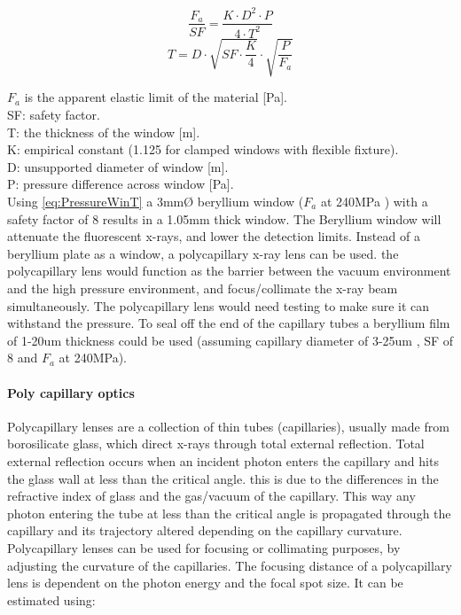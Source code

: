 \begin{equation}
\frac{F_a}{SF} = \frac{K \cdot D^2 \cdot P}{4 \cdot T^2} 
\end{equation}
\begin{equation}
\label{eq:PressureWinT}
T = D \cdot \sqrt{SF \cdot \frac{K}{4}} \cdot \sqrt{\frac{P}{F_a}}
\end{equation}

\noindent$F_a$ is the apparent elastic limit of the material [Pa].\\
SF: safety factor.\\
T: the thickness of the window [m].\\
K: empirical constant (1.125 for clamped windows with flexible fixture).\\
D: unsupported diameter of window [m].\\
P: pressure difference across window [Pa].\\

Using \ref{eq:PressureWinT} a 3mmØ beryllium window ($F_a$ at 240MPa \citep{BeMechanical}) with a safety factor of 8 results in a 1.05mm thick window. The Beryllium window will attenuate the fluorescent x-rays, and lower the detection limits.
Instead of a beryllium plate as a window, a polycapillary x-ray lens can be used. the polycapillary lens would function as the barrier between the vacuum environment and the high pressure environment, and focus/collimate the x-ray beam simultaneously. The polycapillary lens would need testing to make sure it can withstand the pressure. To seal off the end of the capillary tubes a beryllium film of 1-20um thickness could be used (assuming capillary diameter of 3-25um \citep{PolyCapOptics}, SF of 8 and $F_a$ at 240MPa).


\paragraph{Poly capillary optics}
Polycapillary lenses are a collection of thin tubes (capillaries), usually made from borosilicate glass, which direct x-rays through total external reflection. Total external reflection occurs when an incident photon enters the capillary and hits the glass wall at less than the critical angle. this is due to the differences in the refractive index of glass and the gas/vacuum of the capillary. This way any photon entering the tube at less than the critical angle is propagated through the capillary and its trajectory altered depending on the capillary curvature. Polycapillary lenses can be used for focusing or collimating purposes, by adjusting the curvature of the capillaries.
The focusing distance of a polycapillary lens is dependent on the photon energy and the focal spot size. It can be estimated using\citep{PolyCapOptics}:

